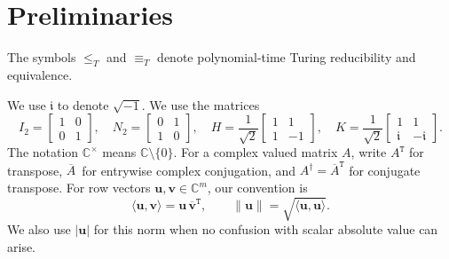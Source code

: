 \section{Preliminaries}


The symbols $\le_T$ and
$\equiv_T$ denote polynomial-time Turing reducibility and equivalence.

We use $\mathfrak i$ to denote $\sqrt{-1}$.
We use the matrices
\[
I_2=\begin{bmatrix}1&0\\0&1\end{bmatrix},\quad
N_2=\begin{bmatrix}0&1\\1&0\end{bmatrix},\quad
H=\frac1{\sqrt2}\begin{bmatrix}1&1\\1&-1\end{bmatrix},\quad
K=\frac1{\sqrt2}\begin{bmatrix}1&1\\
\mathfrak i&-\mathfrak i\end{bmatrix}.
\]
The notation $\mathbb{C}^\times$ means $\mathbb{C}\setminus\{0\}$.
For a complex valued matrix $A$, write $A^{\mathtt T}$ for transpose,
$\overline A\,$ for entrywise complex conjugation, and
$A^\dagger=\overline A^{\mathtt T}$ for conjugate transpose.  For row
vectors $\mathbf u,\mathbf v\in\mathbb C^m$, our convention is
\[
\langle\mathbf u,\mathbf v\rangle
=\mathbf u\,\overline{\mathbf v}^{\mathtt T},\qquad
\|\mathbf u\|=\sqrt{\langle\mathbf u,\mathbf u\rangle}.
\]
We also use $|\mathbf u|$ for this norm when no confusion with scalar
absolute value can arise.









